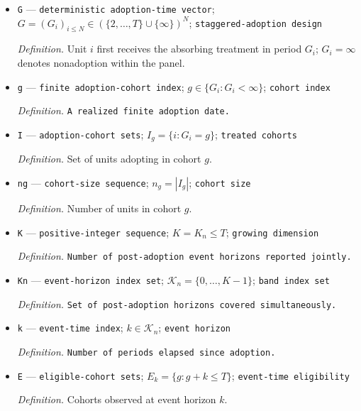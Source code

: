 \documentclass{article}
\begin{document}
\begin{itemize}
  \par\smallskip\noindent\emph{Definition.} \texttt{Index for a calendar period.}
  \item \texttt{G} --- \texttt{deterministic adoption-\allowbreak{}time vector}; \(G=(G_i)_{i\le N}\in(\{2,\ldots,T\}\cup\{\infty\})^N\); \texttt{staggered-\allowbreak{}adoption design}
  \par\smallskip\noindent\emph{Definition.} Unit \(i\) first receives the absorbing treatment in period \(G_i\); \(G_i=\infty\) denotes nonadoption within the panel.
  \item \texttt{g} --- \texttt{finite adoption-\allowbreak{}cohort index}; \(g\in\{G_i:G_i<\infty\}\); \texttt{cohort index}
  \par\smallskip\noindent\emph{Definition.} \texttt{A realized finite adoption date.}
  \item \texttt{I} --- \texttt{adoption-\allowbreak{}cohort sets}; \(I_g=\{i:G_i=g\}\); \texttt{treated cohorts}
  \par\smallskip\noindent\emph{Definition.} Set of units adopting in cohort \(g\).
  \item \texttt{ng} --- \texttt{cohort-\allowbreak{}size sequence}; \(n_g=|I_g|\); \texttt{cohort size}
  \par\smallskip\noindent\emph{Definition.} Number of units in cohort \(g\).
  \item \texttt{K} --- \texttt{positive-\allowbreak{}integer sequence}; \(K=K_n\le T\); \texttt{growing dimension}
  \par\smallskip\noindent\emph{Definition.} \texttt{Number of post-\allowbreak{}adoption event horizons reported jointly.}
  \item \texttt{Kn} --- \texttt{event-\allowbreak{}horizon index set}; \(\mathcal K_n=\{0,\ldots,K-1\}\); \texttt{band index set}
  \par\smallskip\noindent\emph{Definition.} \texttt{Set of post-\allowbreak{}adoption horizons covered simultaneously.}
  \item \texttt{k} --- \texttt{event-\allowbreak{}time index}; \(k\in\mathcal K_n\); \texttt{event horizon}
  \par\smallskip\noindent\emph{Definition.} \texttt{Number of periods elapsed since adoption.}
  \item \texttt{E} --- \texttt{eligible-\allowbreak{}cohort sets}; \(E_k=\{g:g+k\le T\}\); \texttt{event-\allowbreak{}time eligibility}
  \par\smallskip\noindent\emph{Definition.} Cohorts observed at event horizon \(k\).

\end{itemize}
\end{document}
